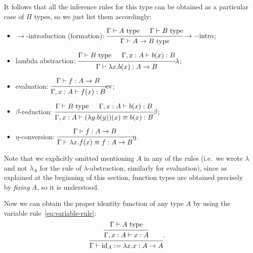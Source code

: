 It follows that all the inference rules for this type can be obtained
as a particular case of $ \Pi $ types, so we just list them accordingly:
\begin{itemize}
\item $ \to $-introduction (formation):
$ \begin{prooftree}
  \hypo{\Gamma \vdash A \text{ type}}
  \hypo{\Gamma \vdash B \text{ type}}
  \infer2{\Gamma \vdash A \to B \text{ type}}
\end{prooftree}\to-\text{intro}
$;
\item lambda abstraction:
$ \begin{prooftree}
  \hypo{\Gamma \vdash B \text{ type}}
  \hypo{\Gamma, x : A \vdash b(x) : B}
  \infer2{\Gamma \vdash \lambda x . b(x) : A \to B}
\end{prooftree}\lambda
$;
\item evaluation:
$ \begin{prooftree}
  \hypo{\Gamma \vdash f : A \to B}
  \infer1{\Gamma, x : A \vdash f(x) :B}
\end{prooftree}\text{ev}
$;
\item $ \beta $-reduction:
$ \begin{prooftree}
  \hypo{\Gamma \vdash B \text{ type}}
  \hypo{\Gamma, x : A \vdash b(x) : B}
  \infer2{\Gamma, x : A \vdash (\lambda y . b(y))(x) \equiv b(x) : B}
\end{prooftree}\beta
$;
\item $ \eta $-conversion:
$ \begin{prooftree}
  \hypo{\Gamma \vdash f : A \to B}
  \infer1{\Gamma \vdash \lambda x . f(x) \equiv f : A \to B}
\end{prooftree}\eta
$.
\end{itemize}

Note that we explicitly omitted mentioning $ A $ in any of the rules
(i.e.\ we wrote $ \lambda $ and not $ \lambda_A $ for the rule of 
$ \lambda $-abstraction, similarly for evaluation), since as explained
at the beginning of this section, function types are obtained precisely
by \emph{fixing} $ A $, so it is understood.

Now we can obtain the proper identity function of any type $ A $ by using
the variable rule~\eqref{eq:variable-rule}:
\[
  \begin{prooftree}
    \hypo{\Gamma \vdash A \text{ type}}
    \infer1{\Gamma, x : A \vdash x : A}
    \infer1{\Gamma \vdash \dr{id}_A := \lambda x . x : A \to A}
  \end{prooftree}.
\]

